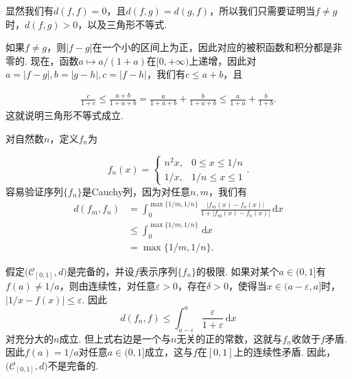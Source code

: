 \begin{ans}
  \begin{enumb}
    \item 显然我们有$d(f,f)=0$，且$d(f,g)=d(g,f)$，所以我们只需要证明当$f\ne g$时，$d(f,g)>0$，以及三角形不等式.

    如果$f\ne g$，则$|f-g|$在一个小的区间上为正，因此对应的被积函数和积分都是非零的. 现在，函数$a\mapsto a/(1+a)$在$[0,+\infty)$上递增，因此对$a=|f-g|,b=|g-h|,c=|f-h|$，我们有$c\le a+b$，且
  \end{enumb}
  \begin{align*}
      \frac c{1+c}  \le \frac{a+b}{1+a+b} =
      \frac{a}{1+a+b}+\frac b{1+a+b}
       \le \frac a{1+a}+\frac b{1+b}.
    \end{align*}
  这就说明三角形不等式成立.

  \begin{enumc}\setcounter{enumi}{1}
    \item 对自然数$n$，定义$f_n$为
  \end{enumc}
  \[
    f_n(x)=\begin{cases}
      n^2x, & 0\le x\le 1/n\\
      1/x, & 1/n\le x\le 1
    \end{cases}.
  \]
  容易验证序列$\{f_n\}$是Cauchy列，因为对任意$n,m$，我们有
  \begin{align*}
    d(f_m,f_n) & = \int_0^{\max\{1/m,1/n\}}
      \frac{|f_m(x)-f_n(x)|}{1+|f_m(x)-f_n(x)|}\,\mathrm dx\\
      & \le \int_0^{\max\{1/m,1/n\}}\,\mathrm dx\\
      & =\max\{1/m,1/n\}.
  \end{align*}

  假定$\big(\mathcal C_{[0,1]},d\big)$是完备的，并设$f$表示序列$\{f_n\}$的极限. 如果对某个$a\in(0,1]$有$f(a)\ne1/a$，则由连续性，对任意$\varepsilon>0$，存在$\delta>0$，使得当$x\in(a-\varepsilon,a]$时，$|1/x-f(x)|\le\varepsilon$. 因此
  \[ d(f_n,f) \le \int_{a-\varepsilon}^a\frac\varepsilon
  {1+\varepsilon}\,\mathrm dx \]
  对充分大的$n$成立. 但上式右边是一个与$n$无关的正的常数，这就与$f_n$收敛于$f$矛盾. 因此$f(a)=1/a$对任意$a\in(0,1]$成立，这与$f$在$[0,1]$上的连续性矛盾. 因此，$\big(\mathcal C_{[0,1]},d\big)$不是完备的.
\end{ans}

